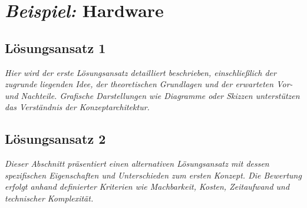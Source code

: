 
\section{\emph{Beispiel:} Hardware\authorA}



\subsection{Lösungsansatz 1}

\emph{Hier wird der erste Lösungsansatz detailliert beschrieben, einschließlich der zugrunde liegenden Idee, der theoretischen Grundlagen und der erwarteten Vor- und Nachteile. Grafische Darstellungen wie Diagramme oder Skizzen unterstützen das Verständnis der Konzeptarchitektur.}



\subsection{Lösungsansatz 2}

\emph{Dieser Abschnitt präsentiert einen alternativen Lösungsansatz mit dessen spezifischen Eigenschaften und Unterschieden zum ersten Konzept. Die Bewertung erfolgt anhand definierter Kriterien wie Machbarkeit, Kosten, Zeitaufwand und technischer Komplexität.}


